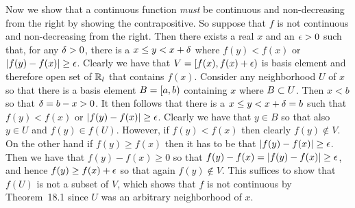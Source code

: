 {{    Now we show that a continuous function \emph{must} be continuous and non-decreasing from the right by showing the contrapositive.
    So suppose that $f$ is not continuous and non-decreasing from the right.
    Then there exists a real $x$ and an $\e > 0$ such that, for any $\d > 0$, there is a $x \leq y <x+\d$ where $f(y) < f(x)$ or $\abs{f(y)-f(x)} \geq \e$.
    Clearly we have that $V = \clop{f(x), f(x)+\e}$ is basis element and therefore open set of $\reals_l$ that contains $f(x)$.
    Consider any neighborhood $U$ of $x$ so that there is a basis element $B = \clop{a,b}$ containing $x$ where $B \ss U$.
    Then $x < b$ so that $\d = b - x > 0$.
    It then follows that there is a $x \leq y < x+\d = b$ such that $f(y) < f(x)$ or $\abs{f(y) - f(x)} \geq \e$.
    Clearly we have that $y \in B$ so that also $y \in U$ and $f(y) \in f(U)$.
    However, if $f(y) < f(x)$ then clearly $f(y) \notin V$.
    On the other hand if $f(y) \geq f(x)$ then it has to be that $\abs{f(y) - f(x)} \geq \e$.
    Then we have that $f(y) - f(x) \geq 0$ so that $f(y) - f(x) = \abs{f(y) - f(x)} \geq \e$, and hence $f(y) \geq f(x) + \e$ so that again $f(y) \notin V$.
    This suffices to show that $f(U)$ is not a subset of $V$, which shows that $f$ is not continuous by Theorem~18.1 since $U$ was an arbitrary neighborhood of $x$.
  }
}


